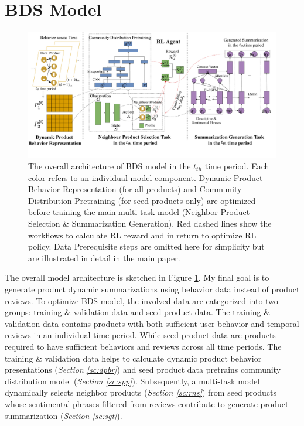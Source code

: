 \section{BDS Model} \label{bds}

\begin{figure} 
	\centering
	\includegraphics[width=1\textwidth]{img/chapter5/pipeline.pdf}
	\caption{ The overall architecture of BDS model in the $t_{th} $ time period. Each color refers to an individual model component. Dynamic Product Behavior Representation (for all products) and Community Distribution Pretraining (for seed products only) are optimized before training the main multi-task model (Neighbor Product Selection \& Summarization Generation). Red dashed lines show the workflows to calculate RL reward and in return to optimize RL policy. Data Prerequisite steps are omitted here for simplicity but are illustrated in detail in the main paper. }
	\label{fig:c5_pipeline}
\end{figure}

The overall model architecture is sketched in Figure \ref{fig:c5_pipeline}. My final goal is to generate product dynamic summarizations using behavior data instead of product reviews. To optimize BDS model, the involved data are categorized into two groups: training \& validation data and seed product data. The training \& validation data contains products with both sufficient user behavior and temporal reviews in an individual time period. While seed product data are products required to have sufficient behaviors and reviews across all time periods. The training \& validation data helps to calculate dynamic product behavior presentations (\textit{Section \ref{sc:dpbr}}) and seed product data pretrains community distribution model (\textit{Section \ref{sc:spp}}). Subsequently, a multi-task model dynamically selects neighbor products (\textit{Section \ref{sc:rns}}) from seed products whose sentimental phrases filtered from reviews contribute to generate product summarization (\textit{Section \ref{sc:sgt}}). 

